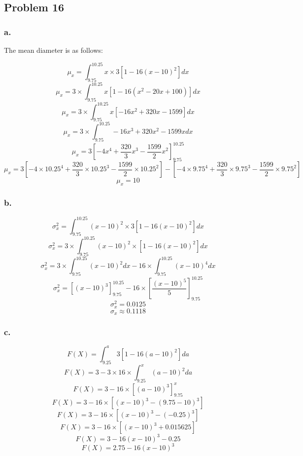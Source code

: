 \documentclass[11pt]{article}
\begin{document}
\subsection*{Problem 16}
\subsubsection*{a.}
The mean diameter is as follows:

\[ \mu_x = \int_{9.75}^{10.25}x \times 3\left[ 1 - 16{\left( x - 10 \right)}^2 \right]dx \]
\[ \mu_x = 3 \times \int_{9.75}^{10.25}x \left[ 1 - 16 \left(x^2 - 20x + 100 \right) \right]dx \]
\[ \mu_x = 3 \times \int_{9.75}^{10.25}x \left[ - 16x^2 + 320x - 1599 \right]dx \]
\[ \mu_x = 3 \times \int_{9.75}^{10.25}-16x^3 + 320x^2 - 1599x dx \]
\[ \mu_x = 3 {\left[ -4x^4 + \frac{320}{3}x^3 - \frac{1599}{2} x^2 \right]}^{10.25}_{9.75} \] 
\[ \mu_x = 3 \left[ -4\times 10.25^4 + \frac{320}{3}\times 10.25^3 - \frac{1599}{2} \times 10.25^2 \right] -
             \left[ -4\times 9.75^4 + \frac{320}{3}\times 9.75^3 - \frac{1599}{2} \times 9.75^2 \right]\] 
\[ \mu_x = 10 \]

\subsubsection*{b.}
\[ \sigma_x^2 = \int_{9.75}^{10.25} {(x - 10)}^2 \times 3\left[ 1 - 16{(x - 10)}^2 \right]dx \]
\[ \sigma_x^2 = 3 \times \int_{9.75}^{10.25} {(x - 10)}^2 \times \left[ 1 - 16{(x - 10)}^2 \right]dx \]
\[ \sigma_x^2 = 3 \times \int_{9.75}^{10.25} {(x - 10)}^2 dx  - 16\times\int_{9.75}^{10.25} {(x - 10)}^4  dx \]
\[ \sigma_x^2 = {\left[ {(x-10)}^3 \right]}^{10.25}_{9.75}  - 16 \times {\left[\frac{{(x - 10)}^5}{5} \right]}^{10.25}_{9.75}\]
\[ \sigma_x^2 = 0.0125 \]
\[ \sigma_x \approx 0.1118 \]

\subsubsection*{c.}
\[ F(X) = \int_{9.25}^{a} 3\left[ 1-16{\left( a-10 \right)}^2 \right] da \]
\[ F(X) = 3 - 3 \times 16 \times \int_{9.25}^{x} {\left( a-10 \right)}^2 da \]
\[ F(X) = 3 - 16 \times {\left[ {(a-10)}^3 \right]}^{x}_{9.75} \]
\[ F(X) = 3 - 16 \times \left[ {(x-10)}^3 - {(9.75-10)}^3 \right] \]
\[ F(X) = 3 - 16 \times \left[ {(x-10)}^3 - {(-0.25)}^3 \right] \]
\[ F(X) = 3 - 16 \times \left[ {(x-10)}^3 + 0.015625 \right] \]
\[ F(X) = 3 - 16{(x-10)}^3 - 0.25 \]
\[ F(X) = 2.75 - 16{(x-10)}^3 \]
\end{document}
